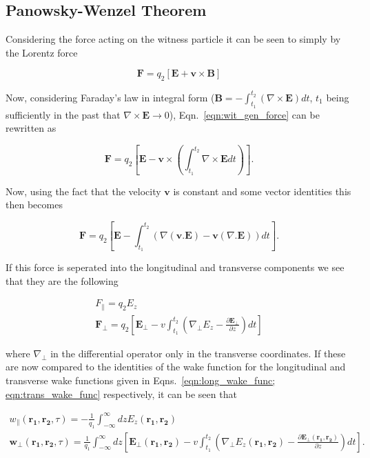 \subsection{Panowsky-Wenzel Theorem}

Considering the force acting on the witness particle it can be seen to simply by the Lorentz force

\begin{equation}
\mathbf{F} = q_{2} \left[\mathbf{E} + \mathbf{v}\times \mathbf{B} \right]
\label{eqn:wit_gen_force}
\end{equation}

Now, considering Faraday's law in integral form ($\mathbf{B} = -\int^{t_{2}}_{t_{1}} \left( \nabla \times \mathbf{E} \right) dt$, $t_{1}$ being sufficiently in the past that $\nabla \times \mathbf{E} \rightarrow 0$), Eqn.~\ref{eqn:wit_gen_force} can be rewritten as

\begin{equation}
\mathbf{F} = q_{2}  \left[\mathbf{E} - \mathbf{v}\times\left(  \int^{t_{2}}_{t_{1}} \nabla \times \mathbf{E} dt \right) \right].
\end{equation}

Now, using the fact that the velocity $\mathbf{v}$ is constant and some vector identities this then becomes

\begin{equation}
\mathbf{F} = q_{2}  \left[\mathbf{E} - \int^{t_{2}}_{t_{1}}\left(  \nabla \left( \mathbf{v} . \mathbf{E} \right)  - \mathbf{v}\left( \nabla . \mathbf{E} \right) \right) dt  \right].
\end{equation}

If this force is seperated into the longitudinal and transverse components we see that they are the following

\begin{align}
F_{\parallel} = q_{2} E_{z} \\
\mathbf{F}_{\perp} = q_{2}  \left[\mathbf{E_{\perp}} - v \int^{t_{2}}_{t_{1}}\left(  \nabla_{\perp}E_{z}  - \frac{\partial\mathbf{E}_{\perp}}{\partial z} \right) dt  \right]
\end{align}

where $\nabla_{\perp}$ in the differential operator only in the transverse coordinates. If these are now compared to the identities of the wake function for the longitudinal and transverse wake functions given in Eqns.~\ref{eqn:long_wake_func; eqn:trans_wake_func} respectively, it can be seen that

\begin{align}
w_{\parallel}\left( \mathbf{r_{1}}, \mathbf{r_{2}}, \tau   \right) = -\frac{1}{q_{1}} \int^{\infty}_{-\infty} dz E_{z} \left( \mathbf{r_{1}}, \mathbf{r_{2}} \right) \\
\mathbf{w}_{\perp} \left(\mathbf{r_{1}}, \mathbf{r_{2}}, \tau   \right) = \frac{1}{q_{1}} \int^{\infty}_{-\infty} dz \left[ \mathbf{E_{\perp}}\left(\mathbf{r_{1}}, \mathbf{r_{2}} \right) - v   \int^{t_{2}}_{t_{1}}\left(  \nabla_{\perp}E_{z}\left(\mathbf{r_{1}}, \mathbf{r_{2}} \right)  - \frac{\partial\mathbf{E}_{\perp}\left(\mathbf{r_{1}}, \mathbf{r_{2}} \right)}{\partial z} \right) dt \right] \label{eqn:trans_wake_middle}.
\end{align}

